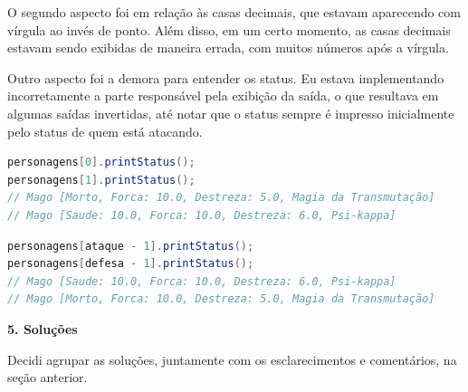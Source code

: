 \documentclass[11pt]{uiobrev}
\begin{document}
O segundo aspecto foi em relação às casas decimais, que estavam aparecendo com vírgula ao invés de ponto. Além disso, em um certo momento, as casas decimais estavam sendo exibidas de maneira errada, com muitos números após a vírgula.

Outro aspecto foi a demora para entender os status. Eu estava implementando incorretamente a parte responsável pela exibição da saída, o que resultava em algumas saídas invertidas, até notar que o status sempre é impresso inicialmente pelo status de quem está atacando.

\begin{lstlisting}[language=Java, caption={Implementação Antes de Corrigir}]
personagens[0].printStatus();
personagens[1].printStatus();
// Mago [Morto, Forca: 10.0, Destreza: 5.0, Magia da Transmutação]
// Mago [Saude: 10.0, Forca: 10.0, Destreza: 6.0, Psi-kappa]
\end{lstlisting}

\begin{lstlisting}[language=Java, caption={Implementação Após de Corrigir}]
personagens[ataque - 1].printStatus();
personagens[defesa - 1].printStatus();
// Mago [Saude: 10.0, Forca: 10.0, Destreza: 6.0, Psi-kappa]
// Mago [Morto, Forca: 10.0, Destreza: 5.0, Magia da Transmutação]
\end{lstlisting}

\vspace{1.5cm}
\Large \textbf{5. Soluções}

\justifying
Decidi agrupar as soluções, juntamente com os esclarecimentos e comentários, na seção anterior.
\end{document}
